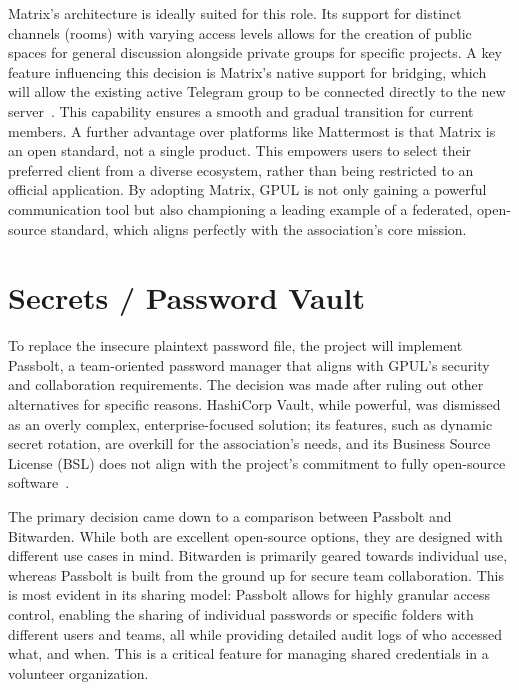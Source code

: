 Matrix's architecture is ideally suited for this role. Its support for distinct channels (rooms) with varying access levels allows for the creation of public spaces for general discussion alongside private groups for specific projects. A key feature influencing this decision is Matrix's native support for bridging, which will allow the existing active Telegram group to be connected directly to the new server~\cite{matrix-docs}. This capability ensures a smooth and gradual transition for current members. A further advantage over platforms like Mattermost is that Matrix is an open standard, not a single product. This empowers users to select their preferred client from a diverse ecosystem, rather than being restricted to an official application. By adopting Matrix, GPUL is not only gaining a powerful communication tool but also championing a leading example of a federated, open-source standard, which aligns perfectly with the association's core mission.

\section{Secrets / Password Vault}

To replace the insecure plaintext password file, the project will implement Passbolt, a team-oriented password manager that aligns with GPUL's security and collaboration requirements. The decision was made after ruling out other alternatives for specific reasons. HashiCorp Vault, while powerful, was dismissed as an overly complex, enterprise-focused solution; its features, such as dynamic secret rotation, are overkill for the association's needs, and its Business Source License (BSL) does not align with the project's commitment to fully open-source software~\cite{vault-bsl}.

The primary decision came down to a comparison between Passbolt and Bitwarden. While both are excellent open-source options, they are designed with different use cases in mind. Bitwarden is primarily geared towards individual use, whereas Passbolt is built from the ground up for secure team collaboration. This is most evident in its sharing model: Passbolt allows for highly granular access control, enabling the sharing of individual passwords or specific folders with different users and teams, all while providing detailed audit logs of who accessed what, and when. This is a critical feature for managing shared credentials in a volunteer organization.

